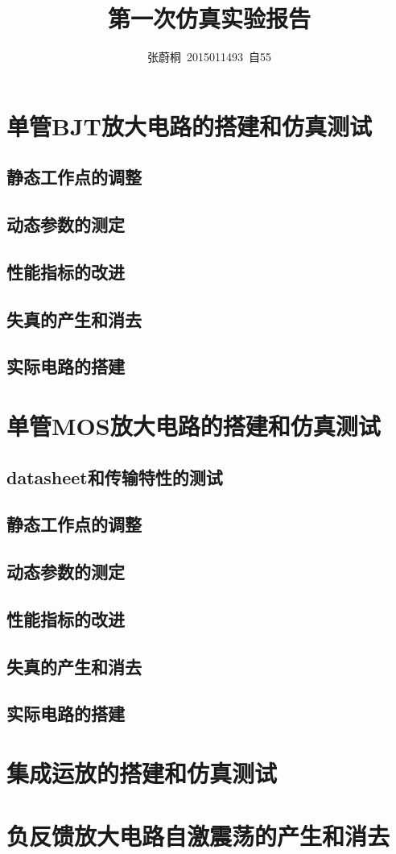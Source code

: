 \documentclass[UTF8,a4paper]{ctexart}
\title{第一次仿真实验报告}
\author{张蔚桐\ 2015011493\ 自55}
\begin{document}
\newcommand{\tabincell}[2]{\begin{tabular}{@{}#1@{}}#2\end{tabular}}
\maketitle
\section{单管BJT放大电路的搭建和仿真测试}
\subsection{静态工作点的调整}
\subsection{动态参数的测定}
\subsection{性能指标的改进}
\subsection{失真的产生和消去}
\subsection{实际电路的搭建}
\section{单管MOS放大电路的搭建和仿真测试}
\subsection{datasheet和传输特性的测试}
\subsection{静态工作点的调整}
\subsection{动态参数的测定}
\subsection{性能指标的改进}
\subsection{失真的产生和消去}
\subsection{实际电路的搭建}
\section{集成运放的搭建和仿真测试}
\section{负反馈放大电路自激震荡的产生和消去}
\end{document}
